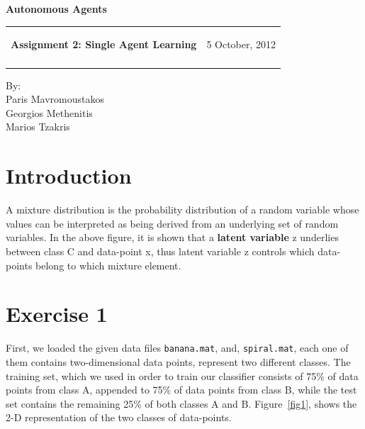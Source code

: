 \documentclass[a4paper,11pt]{article}
\makeatletter
\newcommand{\resheading}[1]{{\large \colorbox{mygrey}{\begin{minipage}{\textwidth}{\textbf{#1 \vphantom{p\^{E}}}}\end{minipage}}}}
\newcommand{\mywebheader}{
  \begin{tabular}{@{}p{5in}p{4in}}
  {\resheading{Assignment 2: Single Agent Learning}} & {\Large 5 October, 2012}\\\vspace{0.2cm}
  \end{tabular}}
\makeatother
\begin{document}
\begin{center}
{\LARGE \textbf{Autonomous Agents}}\\ [1em]
\end{center}
\mywebheader

\begin{center}
{\Large By:} \\ \vspace{0.1cm}
{\Large Paris Mavromoustakos} \\  \vspace{0.1cm}
{\Large Georgios Methenitis} \\ \vspace{0.1cm}
{\Large Marios Tzakris}
\end{center}

\section*{Introduction}
A mixture distribution is the probability distribution of a random variable whose values can be interpreted as being derived from an underlying set of random variables. In the above figure, it is shown that a \textbf{latent variable} z underlies between class C and data-point x, thus latent variable z controls which data-points belong to which mixture element.

\section*{Exercise 1}

First, we loaded the given data files \texttt{banana.mat}, and, \texttt{spiral.mat}, each one of them contains two-dimensional data points, represent two different classes. The training set, which we used in order to train our classifier consists of 75\% of data points from class A, appended to 75\% of data points from class B, while the test set contains the remaining 25\% of both classes A and B. Figure~\ref{fig1}, shows the 2-D representation of the two classes of data-points.
\end{document}
